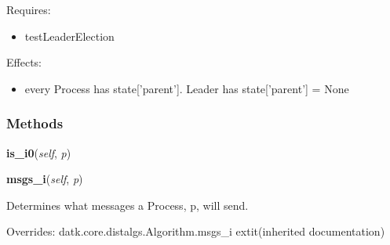 Requires:

\begin{itemize}
\setlength{\parskip}{0.6ex}
  \item testLeaderElection

\end{itemize}

Effects:

\begin{itemize}
\setlength{\parskip}{0.6ex}
  \item every Process has state['parent']. Leader has state['parent'] = None

\end{itemize}



  \subsubsection{Methods}

    \label{datk:core:algs:SynchBFS:is_i0}

    \vspace{0.5ex}

\hspace{.8\funcindent}\begin{boxedminipage}{\funcwidth}

    \raggedright \textbf{is\_i0}(\textit{self}, \textit{p})

\setlength{\parskip}{2ex}
\setlength{\parskip}{1ex}
    \end{boxedminipage}

    \vspace{0.5ex}

\hspace{.8\funcindent}\begin{boxedminipage}{\funcwidth}

    \raggedright \textbf{msgs\_i}(\textit{self}, \textit{p})

\setlength{\parskip}{2ex}
    Determines what messages a Process, p, will send.

\setlength{\parskip}{1ex}
      Overrides: datk.core.distalgs.Algorithm.msgs\_i 	extit{(inherited documentation)}

    \end{boxedminipage}

